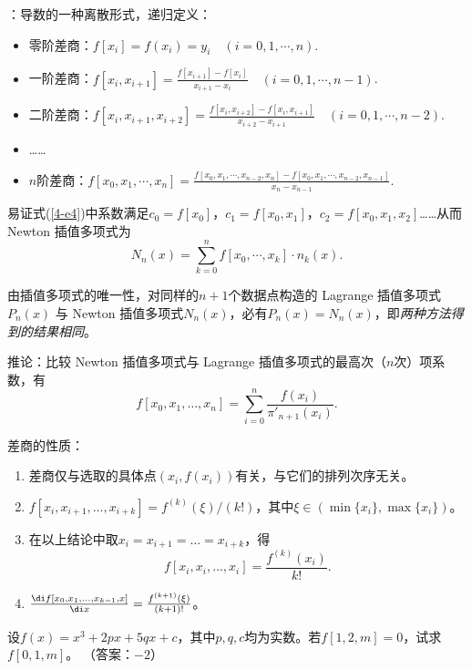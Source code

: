 \entry {}：导数的一种离散形式，递归定义：
\begin{itemize}
    \item 零阶差商：$f[x_i]=f(x_i)=y_i\quad(i=0,1,\cdots,n)$.
    \item 一阶差商：$f[x_i,x_{i+1}]=\frac{f[x_{i+1}]-f[x_i]}{x_{i+1}-x_i}\quad
    (i=0,1,\cdots,n-1)$.
    \item 二阶差商：$f[x_i,x_{i+1},x_{i+2}]=\frac{f[x_i,x_{i+2}]-f[x_i,x_{i+1}]}{
    x_{i+2}-x_{i+1}}\quad(i=0,1,\cdots,n-2)$.
    \item ……
    \item $n$阶差商：$f[x_0,x_1,\cdots,x_n]=\frac{f[x_0,x_1,\cdots,x_{n-2},x_n]-
    f[x_0,x_1,\cdots,x_{n-2},x_{n-1}]}{x_n-x_{n-1}}$.
\end{itemize}

\entry 易证式(\ref{4-e4})中系数满足$c_0=f[x_0]$，$c_1=f[x_0,x_1]$，$c_2=f[x_0,x_1,
x_2]$……从而 Newton 插值多项式为
\begin{equation}
N_n(x)=\sum_{k=0}^nf[x_0,\cdots,x_k]\cdot n_k(x).
\end{equation}

\entry 由插值多项式的唯一性，对同样的$n+1$个数据点构造的 Lagrange 插值多项式$P_n(x)$
与 Newton 插值多项式$N_n(x)$，必有$P_n(x)=N_n(x)$，即\emph{两种方法得到的结果相同}。

\trm 推论：比较 Newton 插值多项式与 Lagrange 插值多项式的最高次（$n$次）项系数，有
\begin{equation}
f[x_0,x_1,\ldots,x_n]=\sum_{i=0}^n\frac{f(x_i)}{\pi'_{n+1}(x_i)}.
\end{equation}

\trm 差商的性质：
\begin{enumerate}
    \item 差商仅与选取的具体点$(x_i,f(x_i))$有关，与它们的排列次序无关。
    \item $f[x_i,x_{i+1},\ldots,x_{i+k}]=f^{(k)}(\xi)/(k!)$，其中$\xi\in(\min\{x_i
    \},\max\{x_i\})$。
    \item 在以上结论中取$x_i=x_{i+1}=\ldots=x_{i+k}$，得
    \begin{equation}\label{4-e5}
    f[x_i,x_i,\ldots,x_i]=\frac{f^{(k)}(x_i)}{k!}.
    \end{equation}
    \item $\frac{\di f[x_0,x_1,\ldots,x_{k-1},x]}{\di x}=\frac{f^{(k+1)}(\xi)}{
    (k+1)!}$。
\end{enumerate}

\example 设$f(x)=x^3+2px+5qx+c$，其中$p,q,c$均为实数。若$f[1,2,m]=0$，试求$f[0,1,m]$。
（答案：$-2$）


